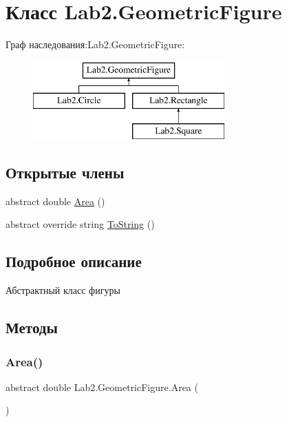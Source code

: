 \hypertarget{class_lab2_1_1_geometric_figure}{}\section{Класс Lab2.\+Geometric\+Figure}
\label{class_lab2_1_1_geometric_figure}
Граф наследования\+:Lab2.\+Geometric\+Figure\+:\begin{figure}[H]
\begin{center}
\leavevmode
\includegraphics[height=3.000000cm]{class_lab2_1_1_geometric_figure}
\end{center}
\end{figure}
\subsection*{Открытые члены}
\begin{DoxyCompactItemize}
\item 
abstract double \hyperlink{class_lab2_1_1_geometric_figure_aeb0853b133cedd1d23f5d8a1d73af8a8}{Area} ()
\item 
abstract override string \hyperlink{class_lab2_1_1_geometric_figure_a2f466edc438f43540ead2bc66925ef0a}{To\+String} ()
\end{DoxyCompactItemize}


\subsection{Подробное описание}
Абстрактный класс фигуры 

\subsection{Методы}
\mbox{\label{class_lab2_1_1_geometric_figure_aeb0853b133cedd1d23f5d8a1d73af8a8}} 
\subsubsection{\texorpdfstring{Area()}{Area()}}
{\footnotesize\ttfamily abstract double Lab2.\+Geometric\+Figure.\+Area (\begin{DoxyParamCaption}{ }\end{DoxyParamCaption})\hspace{0.3cm}{\ttfamily [pure virtual]}}



